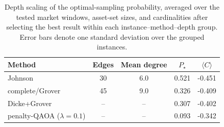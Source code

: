 \begin{table}[t]
\centering
\caption{
Depth scaling of the optimal-sampling probability, averaged over the tested
market windows, asset-set sizes, and cardinalities after selecting the best
result within each instance--method--depth group. Error bars denote one
standard deviation over the grouped instances.
}
\label{tab:single-instance-compact}
\begin{tabular}{lcccc}
\toprule
Method & Edges & Mean degree & $P_\star$ & $\langle C\rangle$\\
\midrule
Johnson & 30 & 6.0 & 0.521 & -0.451\\
complete/Grover & 45 & 9.0 & 0.326 & -0.409\\
Dicke+Grover & -- & -- & 0.307 & -0.402\\
penalty-QAOA ($\lambda=0.1$) & -- & -- & 0.093 & -0.342\\
\bottomrule
\end{tabular}
\end{table}

